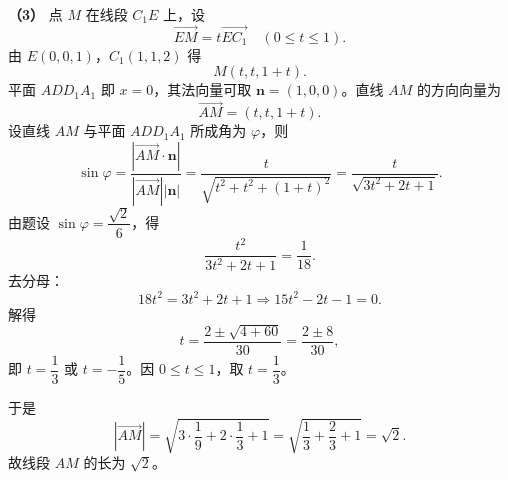 \begin{answer}
\textbf{（3）} 点 $M$ 在线段 $C_1E$ 上，设
\nopagebreak[4]
\[\overrightarrow{EM}=t\overrightarrow{EC_1}\quad(0\leqslant t\leqslant1).\]
由 $E(0,0,1)$，$C_1(1,1,2)$ 得
\nopagebreak[4]
\[M(t,t,1+t).\]
平面 $ADD_1A_1$ 即 $x=0$，其法向量可取 $\boldsymbol n=(1,0,0)$。直线 $AM$ 的方向向量为
\nopagebreak[4]
\[\overrightarrow{AM}=(t,t,1+t).\]
设直线 $AM$ 与平面 $ADD_1A_1$ 所成角为 $\varphi$，则
\nopagebreak[4]
\[\sin\varphi
=\frac{|\overrightarrow{AM}\cdot\boldsymbol n|}{|\overrightarrow{AM}||\boldsymbol n|}
=\frac{t}{\sqrt{t^2+t^2+(1+t)^2}}
=\frac{t}{\sqrt{3t^2+2t+1}}.\]
由题设 $\sin\varphi=\dfrac{\sqrt2}{6}$，得
\nopagebreak[4]
\[\frac{t^2}{3t^2+2t+1}=\frac1{18}.\]
去分母：
\nopagebreak[4]
\[18t^2=3t^2+2t+1\Longrightarrow 15t^2-2t-1=0.\]
解得
\nopagebreak[4]
\[t=\frac{2\pm\sqrt{4+60}}{30}=\frac{2\pm8}{30},\]
即 $t=\dfrac13$ 或 $t=-\dfrac15$。因 $0\leqslant t\leqslant1$，取 $t=\dfrac13$。

于是
\nopagebreak[4]
\[|\overrightarrow{AM}|=\sqrt{3\cdot\frac19+2\cdot\frac13+1}
=\sqrt{\frac13+\frac23+1}=\sqrt2.\]
故线段 $AM$ 的长为 $\sqrt2$。




\end{answer}
